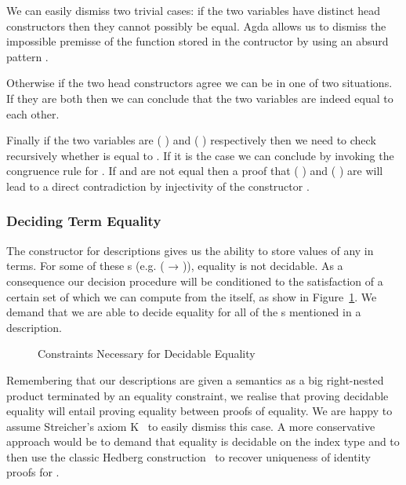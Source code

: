 
We can easily dismiss two trivial cases: if the two variables have distinct
head constructors then they cannot possibly be equal. Agda allows us to
dismiss the impossible premisse of the function stored in the 
contructor by using an absurd pattern \AS{()}.


Otherwise if the two head constructors agree we can be in one of two
situations. If they are both  then we can conclude that the two
variables are indeed equal to each other.


Finally if the two variables are {( )} and {( )}
respectively then we need to check recursively whether  is equal
to . If it is the case we can conclude by invoking the congruence
rule for . If  and  are not equal then a proof that
{( )} and {( )} are will lead to a direct
contradiction by injectivity of the constructor .


\subsubsection{Deciding Term Equality}

The constructor  for descriptions gives us the ability to store
values of any  in terms. For some of these s (e.g.
{( → )}), equality is not decidable. As a consequence
our decision procedure will be conditioned to the satisfaction of a
certain set of  which we can compute from the 
itself, as show in Figure~\ref{fig:eqconstraints}. We demand that we are
able to decide equality for all of the s mentioned in a description.

\begin{figure}[h]
\caption{Constraints Necessary for Decidable Equality}\label{fig:eqconstraints}
\end{figure}

Remembering that our descriptions are given a semantics as a big right-nested
product terminated by an equality constraint, we realise that proving decidable
equality will entail proving equality between proofs of equality. We are happy
to assume Streicher's axiom K~\cite{DBLP:conf/lics/HofmannS94} to easily
dismiss this case. A more conservative approach would be to demand that equality
is decidable on the index type  and to then use the classic Hedberg
construction~\cite{DBLP:journals/jfp/Hedberg98} to recover uniqueness of
identity proofs for .

